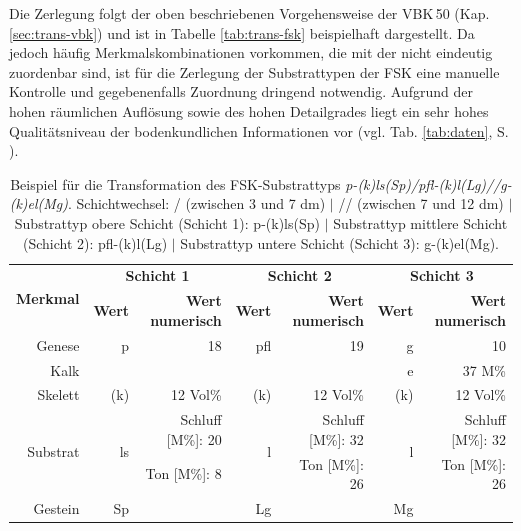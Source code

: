 Die Zerlegung folgt der oben beschriebenen Vorgehensweise der VBK\,50 (Kap. \ref{sec:trans-vbk}) und ist in Tabelle \ref{tab:trans-fsk} beispielhaft dargestellt. Da jedoch häufig Merkmalskombinationen vorkommen, die mit der  nicht eindeutig zuordenbar sind, ist für die Zerlegung der Substrattypen der FSK eine manuelle Kontrolle und gegebenenfalls Zuordnung dringend notwendig. Aufgrund der hohen räumlichen Auflösung sowie des hohen Detailgrades liegt ein sehr hohes Qualitätsniveau der bodenkundlichen Informationen vor (vgl. Tab. \ref{tab:daten}, S. \pageref{tab:daten}).


\begin{table}[t]
  \centering
  \caption[Beispiel für die Transformation des FSK-Substrattyps \textit{p-(k)ls(Sp)/pfl-(k)l(Lg)//g-(k)el(Mg)}.]{Beispiel für die Transformation des FSK-Substrattyps \textit{p-(k)ls(Sp)/pfl-(k)l(Lg)//g-(k)el(Mg)}. Schichtwechsel: / (zwischen 3 und 7 dm) $|$ // (zwischen 7 und 12 dm)
$|$ Substrattyp obere Schicht (Schicht 1): p-(k)ls(Sp) $|$ Substrattyp mittlere Schicht (Schicht 2): pfl-(k)l(Lg) $|$ Substrattyp untere Schicht (Schicht 3): g-(k)el(Mg).}\label{tab:trans-fsk}
\vspace*{6pt}
    \begin{tabular}{r|r|r|r|r|r|r}
    \toprule
    \multirow{2}[4]{*}{\textbf{Merkmal}} & \multicolumn{2}{c|}{\textbf{Schicht 1}} & \multicolumn{2}{c|}{\textbf{Schicht 2}} & \multicolumn{2}{c}{\textbf{Schicht 3}} \\
    
          & \textbf{Wert} & \textbf{Wert numerisch} & \textbf{Wert} & \textbf{Wert numerisch} & \textbf{Wert} & \textbf{Wert numerisch} \\\midrule
    Genese & p     & 18    & pfl   & 19    & g     & 10 \\\midrule
    Kalk  &       &       &       &       & e     & 37 M\% \\\midrule
    Skelett & (k)   & 12 Vol\% & (k)   & 12 Vol\% & (k)   & 12 Vol\% \\\midrule
    \multirow{2}[2]{*}{Substrat} & \multirow{2}[2]{*}{ls} & Schluff [M\%]: 20 & \multirow{2}[2]{*}{l} & Schluff [M\%]: 32 & \multirow{2}[2]{*}{l} & Schluff [M\%]: 32 \\
          &       & Ton [M\%]: 8 &       & Ton [M\%]: 26 &       & Ton [M\%]: 26 \\\midrule
    Gestein & Sp    &       & Lg    &       & Mg    &  \\
    \bottomrule
    \end{tabular}%
  \label{tab:addlabel}%
\end{table}%


